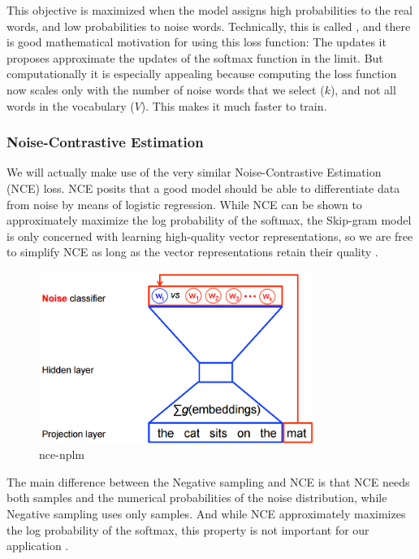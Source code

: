  This objective is maximized when the model assigns high probabilities to the real words, and low probabilities to noise words. Technically, this is called \textcite{ Negative Sampling}, and there is good mathematical motivation for using this loss function: The updates it proposes approximate the updates of the softmax function in the limit. But computationally it is especially appealing because computing the loss function now scales only with the number of noise words that we select ($k$), and not all words in the vocabulary ($V$). This makes it much faster to train.
 
\subsubsection{Noise-Contrastive Estimation}

We will actually make use of the very similar Noise-Contrastive Estimation (NCE) loss. NCE posits that a good model should be able to differentiate data from noise by means of logistic regression. While NCE can be shown to approximately maximize the log probability of the softmax, the Skip-gram model is only concerned with learning high-quality vector representations, so we are free to simplify NCE as long as the vector representations retain their quality \cite{DBLP:journals/corr/MikolovSCCD13}.

\begin{figure}[H]%
    \center%
    \includegraphics[width=0.8\textwidth]{images/amira/nce-nplm.png}%
    \caption[nce]{nce-nplm}\label{fig:nce-nplm}%
\end{figure}

The main difference between the Negative sampling and NCE is that NCE needs both
samples and the numerical probabilities of the noise distribution, while Negative sampling uses only samples. And while NCE approximately maximizes the log probability of the softmax, this property is not important for our application \cite{DBLP:journals/corr/MikolovSCCD13}.

